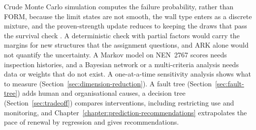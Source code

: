 Crude Monte Carlo simulation computes the failure probability, rather than
FORM, because the limit states are not smooth, the wall type enters as a
discrete mixture, and the proven-strength update reduces to keeping the draws
that pass the survival check \parencite{hemel2024}. A deterministic check with
partial factors would carry the margins for new structures that the
assignment questions, and ARK alone would not quantify the uncertainty. A
Markov model on NEN~2767 scores needs inspection histories, and a Bayesian
network or a multi-criteria analysis needs data or weights that do not exist. A
one-at-a-time sensitivity analysis shows what to measure
(Section~\ref{sec:dimension-reduction}). A fault tree
(Section~\ref{sec:fault-tree}) adds human and organisational causes, a decision
tree (Section~\ref{sec:tradeoff}) compares interventions, including
restricting use and monitoring, and Chapter~\ref{chapter:prediction-recommendations}
extrapolates the pace of renewal by regression and gives recommendations.
